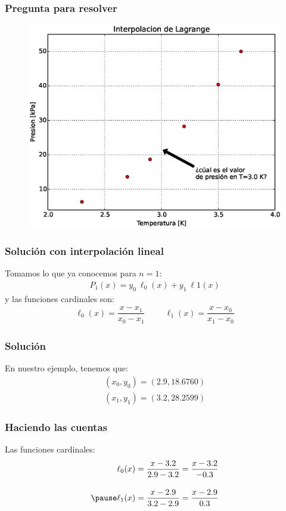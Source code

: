 \documentclass[12pt]{beamer}
\begin{document}
\begin{frame}
\frametitle{Pregunta para resolver}
\vspace*{-0.25cm}
\begin{figure}
	\centering
	\includegraphics[scale=0.47]{Imagenes/grafica03.eps} 
\end{figure}
\end{frame}
\begin{frame}[fragile]
\frametitle{Solución con interpolación lineal}
Tomamos lo que ya conocemos para $n = 1$:
\pause
\begin{align*}
P_{1} (x) = y_{0} \: \ell_{0} (x) + y_{1} \: \ell{1} (x)
\end{align*}
\pause
y las funciones cardinales son:
\pause
\begin{align*}
\ell_{0} (x) = \dfrac{x - x_{1}}{x_{0} - x_{1}} \hspace{1cm} \ell_{1} (x) = \dfrac{x - x_{0}}{x_{1} - x_{0}}
\end{align*}
\end{frame}
\begin{frame}
\frametitle{Solución}
En nuestro ejemplo, tenemos que:
\pause
\begin{align*}
(x_{0}, y_{0}) = (2.9, 18.6760) \\[1em]
(x_{1}, y_{1}) = (3.2, 28.2599)
\end{align*}
\end{frame}
\begin{frame}
\frametitle{Haciendo las cuentas}
Las funciones cardinales:
\pause
\begin{eqnarray*}
\begin{aligned}
\ell_{0} (x) &= \dfrac{x - 3.2}{2.9 - 3.2} = \dfrac{x - 3.2}{-0.3} \\[1em] \pause
\ell_{1} (x) &= \dfrac{x - 2.9}{3.2 - 2.9} = \dfrac{x - 2.9}{0.3}
\end{aligned}
\end{eqnarray*}
\end{frame}
\end{document}
